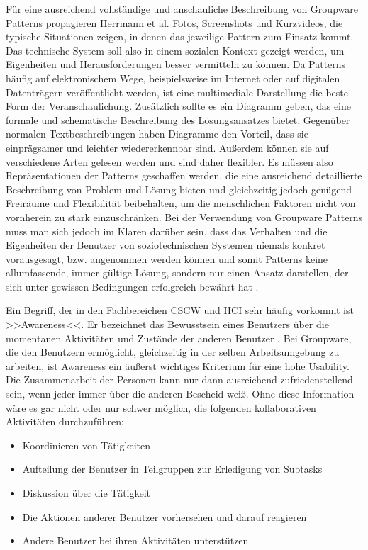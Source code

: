 \medskip Für eine ausreichend vollständige und anschauliche Beschreibung von Groupware Patterns propagieren Herrmann et al. Fotos, Screenshots und Kurzvideos, die typische Situationen zeigen, in denen das jeweilige Pattern zum Einsatz kommt. Das technische System soll also in einem sozialen Kontext gezeigt werden, um Eigenheiten und Herausforderungen besser vermitteln zu können. Da Patterns häufig auf elektronischem Wege, beispielsweise im Internet oder auf digitalen Datenträgern veröffentlicht werden, ist eine multimediale Darstellung die beste Form der Veranschaulichung. Zusätzlich sollte es ein Diagramm geben, das eine formale und schematische Beschreibung des Lösungsansatzes bietet. Gegenüber normalen Textbeschreibungen haben Diagramme den Vorteil, dass sie einprägsamer und leichter wiedererkennbar sind. Außerdem können sie auf verschiedene Arten gelesen werden und sind daher flexibler. Es müssen also Repräsentationen der Patterns geschaffen werden, die eine ausreichend detaillierte Beschreibung von Problem und Lösung bieten und gleichzeitig jedoch genügend Freiräume und Flexibilität beibehalten, um die menschlichen Faktoren nicht von vornherein zu stark einzuschränken. Bei der Verwendung von Groupware Patterns muss man sich jedoch im Klaren darüber sein, dass das Verhalten und die Eigenheiten der Benutzer von soziotechnischen Systemen niemals konkret vorausgesagt, bzw. angenommen werden können und somit Patterns keine allumfassende, immer gültige Lösung, sondern nur einen Ansatz darstellen, der sich unter gewissen Bedingungen erfolgreich bewährt hat \citep{Herrmann:2003}.

\bigskip Ein Begriff, der in den Fachbereichen CSCW und HCI sehr häufig vorkommt ist >>Awareness<<. Er bezeichnet das Bewusstsein eines Benutzers über die momentanen Aktivitäten und Zustände der anderen Benutzer \citep{Dourish:1992, Hornecker:2008}. Bei Groupware, die den Benutzern ermöglicht, gleichzeitig in der selben Arbeitsumgebung zu arbeiten, ist Awareness ein äußerst wichtiges Kriterium für eine hohe Usability. Die Zusammenarbeit der Personen kann nur dann ausreichend zufriedenstellend sein, wenn jeder immer über die anderen Bescheid weiß. Ohne diese Information wäre es gar nicht oder nur schwer möglich, die folgenden kollaborativen Aktivitäten durchzuführen:

\begin{itemize}
	\item{Koordinieren von Tätigkeiten}
	\item{Aufteilung der Benutzer in Teilgruppen zur Erledigung von Subtasks}
	\item{Diskussion über die Tätigkeit}
	\item{Die Aktionen anderer Benutzer vorhersehen und darauf reagieren}
	\item{Andere Benutzer bei ihren Aktivitäten unterstützen}
\end{itemize}
\begin{flushright}
	\citep{Gutwin:1999}
\end{flushright} 

